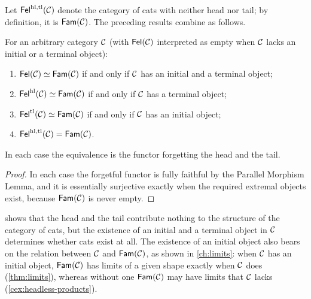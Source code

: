 Let $\mathsf{Fel}^{\mathrm{hl},\mathrm{tl}}(\mathcal{C})$ denote the category of cats with neither head nor
tail; by definition, it is $\mathsf{Fam}(\mathcal{C})$. The preceding results combine as
follows.

\begin{theorem}\label{thm:anatomy}
For an arbitrary category $\mathcal{C}$ (with $\mathsf{Fel}(\mathcal{C})$ interpreted as empty when
$\mathcal{C}$ lacks an initial or a terminal object):
\begin{enumerate}
\item $\mathsf{Fel}(\mathcal{C})\simeq\mathsf{Fam}(\mathcal{C})$ if and only if $\mathcal{C}$ has an initial and a terminal object;
\item $\mathsf{Fel}^{\mathrm{hl}}(\mathcal{C})\simeq\mathsf{Fam}(\mathcal{C})$ if and only if $\mathcal{C}$ has a terminal object;
\item $\mathsf{Fel}^{\mathrm{tl}}(\mathcal{C})\simeq\mathsf{Fam}(\mathcal{C})$ if and only if $\mathcal{C}$ has an initial object;
\item $\mathsf{Fel}^{\mathrm{hl},\mathrm{tl}}(\mathcal{C})=\mathsf{Fam}(\mathcal{C})$.
\end{enumerate}
In each case the equivalence is the functor forgetting the head and the tail.
\end{theorem}

\begin{proof}
In each case the forgetful functor is fully faithful by the Parallel Morphism
Lemma, and it is essentially surjective exactly when the required extremal
objects exist, because $\mathsf{Fam}(\mathcal{C})$ is never empty.
\end{proof}

\begin{remark}\label{rem:anatomy-moral}
 shows that the head and the tail contribute nothing to the
structure of the category of cats, but the existence of an initial and a
terminal object in $\mathcal{C}$ determines whether cats exist at all. The existence of
an initial object also bears on the relation between $\mathcal{C}$ and $\mathsf{Fam}(\mathcal{C})$, as
shown in \cref{ch:limits}: when $\mathcal{C}$ has an initial object, $\mathsf{Fam}(\mathcal{C})$ has
limits of a given shape exactly when $\mathcal{C}$ does (\cref{thm:limits}), whereas
without one $\mathsf{Fam}(\mathcal{C})$ may have limits that $\mathcal{C}$ lacks
(\cref{cex:headless-products}).
\end{remark}
